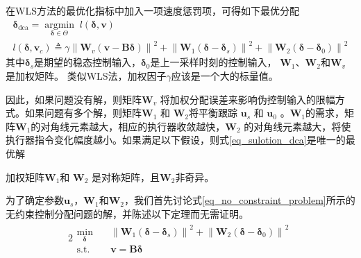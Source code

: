 在WLS方法的最优化指标中加入一项速度惩罚项，可得如下最优分配
\begin{gather}
{\bm{\delta}_{{\text{dca}}}} = \mathop {{\text{argmin}}}\limits_{\bm{\delta} \in \Theta }\; l\left( {\bm{\delta},\bm{v}} \right) \label{eq_sulotion_dca}	\\
l\left( {\bm{\delta},{\bm{v}_{{c}}}} \right) \triangleq 
\gamma {\left\| {{\bm{W}_{{v}}}\left( {\bm{v} - \bm{B\delta}} \right)} \right\|^2} + 
{\left\| {{\bm{W}_1}\left( {\bm{\delta} - {\bm{\delta}_{{s}}}} \right)} \right\|^2} + 
{\left\| {{\bm{W}_2}\left( {\bm{\delta} - {\bm{\delta}_{{0}}}} \right)} \right\|^2} \label{29}
\end{gather}
其中${{\bm{\delta}}_{ {s}}}$是期望的稳态控制输入，${{\bm{\delta}}_{0}}$是上一采样时刻的控制输入， ${{\bm{W}}_{1}}$、${{\bm{W}}_{2}}$和${{\bm{W}}_{ {v}}}$ 是加权矩阵。 类似WLS法，加权因子$ \gamma $应该是一个大的标量值。

因此，如果问题没有解，则矩阵${{\bm{W}}_{ {v}}}$ 将加权分配误差来影响伪控制输入的限幅方式。如果问题有多个解，则矩阵${{\bm{W}}_{1}}$ 和 ${{\bm{W}}_{2}}$将平衡跟踪 ${{\bm{u}}_{ {s}}}$ 和 ${{\bm{u}}_{0}}$ 。${{\bm{W}}_{1}}$的需求，矩阵${{\bm{W}}_{1}}$的对角线元素越大，相应的执行器收敛越快，${{\bm{W}}_{2}}$ 的对角线元素越大，将使执行器指令变化幅度越小。如果满足以下假设，则式\eqref {eq_sulotion_dca}是唯一的最优解\cite{Harkegaard_2004}
\begin{assumption}
加权矩阵${{\bm{W}}_{1}}$和 ${{\bm{W}}_{2}}$ 是对称矩阵，且$ {{\bm{W}}_{2}}$非奇异。	\label{assum_dca1}
\end{assumption}

为了确定参数${{\bm{u}}_{ {s}}}$，$\bm{W}_1$和$\bm{W}_2$，我们首先讨论式\eqref{eq_no_constraint_problem}所示的无约束控制分配问题的解，并陈述以下定理而无需证明\cite{Harkegaard_2004}。
\begin{alignat}{2}
\begin{split}
\mathop {{\text{min}}}\limits_{\bm{\delta} }\quad& {\left\| {{\bm{W}_1}\left( {\bm{\delta} - {\bm{\delta}_{{s}}}} \right)} \right\|^2} + 
{\left\| {{\bm{W}_2}\left( {\bm{\delta} - {\bm{\delta}_{{0}}}} \right)} \right\|^2}\\
\mbox{s.t.}\quad
&\bm{v }=\bm{B}\bm{\delta} 
\end{split} \label{eq_no_constraint_problem}
\end{alignat}

